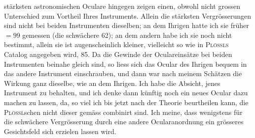 \par{}
\clearpage{}
\noindent stärksten astronomischen Oculare hingegen zeigen einen, obwohl nicht grossen Unterschied zum Vortheil Ihres Instruments. Allein die stärksten Vergrösserungen sind nicht bei beiden Instrumenten dieselben; an dem Ihrigen hatte ich sie früher $=99$ gemessen (die schwächere 62); an dem andern habe ich sie noch nicht bestimmt, allein sie ist augenscheinlich kleiner, vielleicht so wie in \textsc{Plössls} Catalog angegeben wird, 85. Da die Gewinde der Oculareinsätze bei beiden Instrumenten beinahe gleich sind, so liess sich das Ocular des Ihrigen bequem in das andere Instrument einschrauben, und dann war nach meinem Schätzen die Wirkung ganz dieselbe, wie an dem Ihrigen. Ich habe die Absicht, jenes Instrument zu behalten, und ich denke dann künftig noch ein neues Ocular dazu machen zu lassen, da, so viel ich bis jetzt nach der Theorie beurtheilen kann, die \textsc{Plössl}schen nicht dieser gemäss combinirt sind. Ich meine, dass wenigstens für die schwächere Vergrösserung durch eine andere Ocularanordnung  ein grösseres Gesichtsfeld sich erzielen lassen wird.

